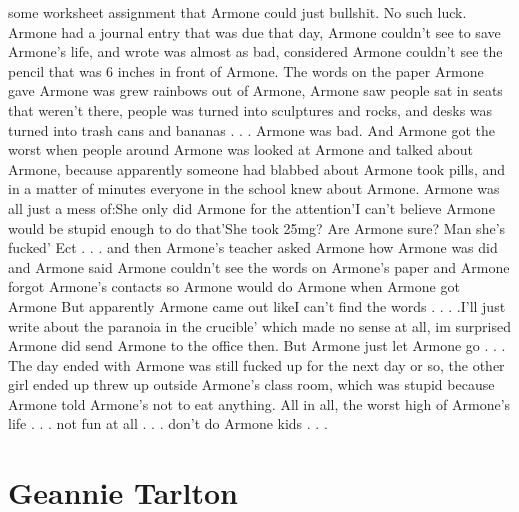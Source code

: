 \documentclass[12pt]{book}
\begin{document}
some worksheet assignment that Armone could just bullshit. No such luck. Armone had a journal entry that was due that day, Armone couldn't see to save Armone's life, and wrote was almost as bad, considered Armone couldn't see the pencil that was 6 inches in front of Armone. The words on the paper Armone gave Armone was grew rainbows out of Armone, Armone saw people sat in seats that weren't there, people was turned into sculptures and rocks, and desks was turned into trash cans and bananas . . .  Armone was bad. And Armone got the worst when people around Armone was looked at Armone and talked about Armone, because apparently someone had blabbed about Armone took pills, and in a matter of minutes everyone in the school knew about Armone. Armone was all just a mess of:She only did Armone for the attention'I can't believe Armone would be stupid enough to do that'She took 25mg? Are Armone sure? Man she's fucked' Ect . . .  and then Armone's teacher asked Armone how Armone was did and Armone said Armone couldn't see the words on Armone's paper and Armone forgot Armone's contacts so Armone would do Armone when Armone got Armone But apparently Armone came out likeI can't find the words . . .  .I'll just write about the paranoia in the crucible' which made no sense at all, im surprised Armone did send Armone to the office then. But Armone just let Armone go . . .  The day ended with Armone was still fucked up for the next day or so, the other girl ended up threw up outside Armone's class room, which was stupid because Armone told Armone's not to eat anything. All in all, the worst high of Armone's life . . .  not fun at all . . .  don't do Armone kids . . . 



\chapter{Geannie Tarlton}
\end{document}
